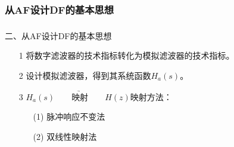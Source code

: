 \documentclass[notheorems,compress,mathserif,table]{beamer}
\begin{document}
\subsubsection*{从AF设计DF的基本思想}
\begin{frame}[shrink]\frametitle{}%
{\heiti 二、从AF设计DF的基本思想}
\begin{enumerate}
  \item [1] 将数字滤波器的技术指标转化为模拟滤波器的技术指标。 \newline
  \item [2] 设计模拟滤波器，得到其系统函数$H_a(s)$。 \newline
  \item [3] $H_a(s)\quad\underrightarrow{\quad\mbox{映射}\quad}\quad H(z)$\quad 映射方法：\newline
      \begin{enumerate}
        \item [(1)]脉冲响应不变法 \newline
        \item [(2)]双线性映射法   \newline
      \end{enumerate}
\end{enumerate}
%
%
%
%
\end{frame}
%
%
\end{document}
